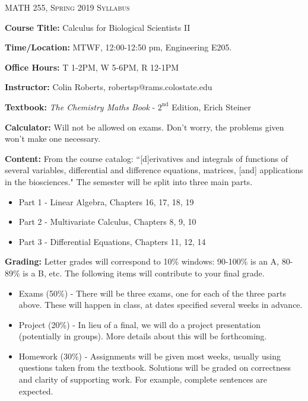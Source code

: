 \documentclass[12pt]{amsbook}
\begin{document}

\SetWatermarkText{
\begin{minipage}[c][8cm]{8cm}
\begin{center}
 
\end{center}
\end{minipage}
}



\begin{center}
   \textsc{\large MATH 255, Spring 2019 Syllabus}
\end{center}
\vspace{.5cm}

\textbf{Course Title:} Calculus for Biological Scientists II

\textbf{Time/Location:} MTWF, 12:00-12:50 pm, Engineering E205. 

\textbf{Office Hours:} T 1-2PM, W 5-6PM, R 12-1PM

\textbf{Instructor:} Colin Roberts, robertsp@rams.colostate.edu

\textbf{Textbook:} \emph{The Chemistry Maths Book} - $2^{\text{nd}}$ Edition, Erich Steiner

\textbf{Calculator:} Will not be allowed on exams.  Don't worry, the problems given won't make one necessary.

\textbf{Content:} From the course catalog: ``[d]erivatives and integrals of functions of several variables, differential and difference equations, matrices, [and] applications in the biosciences." The semester will be split into three main parts.
\begin{itemize}
\item[] Part 1 - Linear Algebra, Chapters 16, 17, 18, 19
\item[] Part 2 - Multivariate Calculus, Chapters 8, 9, 10
\item[] Part 3 - Differential Equations, Chapters 11, 12, 14
\end{itemize}

\textbf{Grading:} Letter grades will correspond to 10\% windows: 90-100\% is an A, 80-89\% is a B, etc. The following items will contribute to your final grade.
\begin{itemize}
\item[] Exams (50\%) - There will be three exams, one for each of the three parts above. These will happen in class, at dates specified several weeks in advance.
\item[] Project (20\%) - In lieu of a final, we will do a project presentation (potentially in groups). More details about this will be forthcoming.
\item[] Homework (30\%) - Assignments will be given most weeks, usually using questions taken from the textbook. Solutions will be graded on correctness and clarity of supporting work. For example, complete sentences are expected.
\end{itemize}
\end{document}
